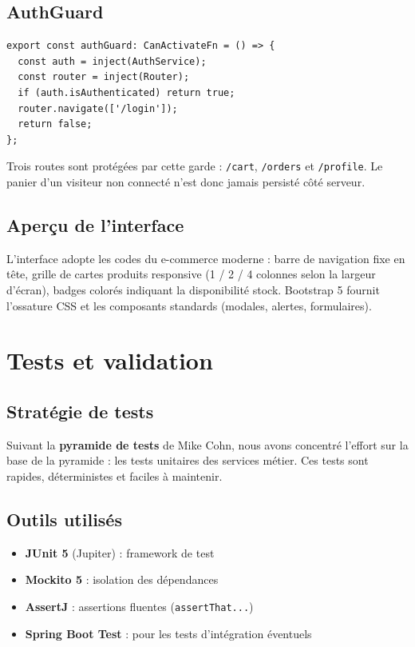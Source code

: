 \documentclass[11pt,a4paper,oneside]{report}
\begin{document}
\section{AuthGuard}

\begin{lstlisting}[style=tsstyle]
export const authGuard: CanActivateFn = () => {
  const auth = inject(AuthService);
  const router = inject(Router);
  if (auth.isAuthenticated) return true;
  router.navigate(['/login']);
  return false;
};
\end{lstlisting}

Trois routes sont protégées par cette garde : \texttt{/cart},
\texttt{/orders} et \texttt{/profile}. Le panier d'un visiteur non
connecté n'est donc jamais persisté côté serveur.

\section{Aperçu de l'interface}

L'interface adopte les codes du e-commerce moderne : barre de navigation
fixe en tête, grille de cartes produits responsive (1 / 2 / 4 colonnes
selon la largeur d'écran), badges colorés indiquant la disponibilité
stock. Bootstrap 5 fournit l'ossature CSS et les composants standards
(modales, alertes, formulaires).

\chapter{Tests et validation}

\section{Stratégie de tests}

Suivant la \textbf{pyramide de tests} de Mike Cohn, nous avons concentré
l'effort sur la base de la pyramide : les tests unitaires des services
métier. Ces tests sont rapides, déterministes et faciles à maintenir.

\section{Outils utilisés}

\begin{itemize}
  \item \textbf{JUnit 5} (Jupiter) : framework de test
  \item \textbf{Mockito 5} : isolation des dépendances
  \item \textbf{AssertJ} : assertions fluentes (\texttt{assertThat...})
  \item \textbf{Spring Boot Test} : pour les tests d'intégration éventuels
\end{itemize}
\end{document}

